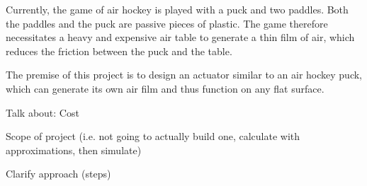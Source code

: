 
Currently, the game of air hockey is played with a puck and two 
paddles.
Both the paddles and the puck are passive pieces of plastic. The game therefore
necessitates a heavy and expensive air table to generate a thin film of air,
which reduces the friction between the puck and the table.

The premise of this project is to design an actuator similar to an air hockey
puck, which can generate its own air film and thus function on any flat surface.

Talk about:
Cost

Scope of project (i.e. not going to actually build one, calculate with
approximations, then simulate)

Clarify approach (steps)

\asterbreak
